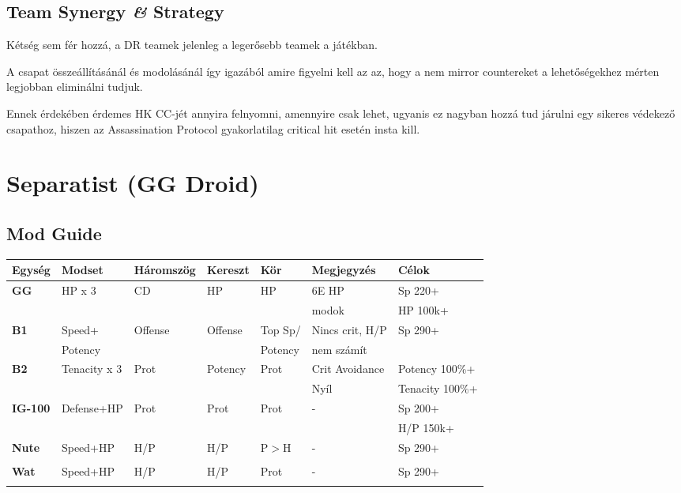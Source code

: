 \documentclass[11pt]{report}
\begin{document}
\section{Team Synergy \textit{\&} Strategy}
Kétség sem fér hozzá, a DR teamek jelenleg a legerősebb teamek a játékban. \par
A csapat összeállításánál és modolásánál így igazából amire figyelni kell az az, hogy a nem mirror countereket a lehetőségekhez mérten legjobban eliminálni tudjuk.\par
Ennek érdekében érdemes HK CC-jét annyira felnyomni, amennyire csak lehet, ugyanis ez nagyban hozzá tud járulni egy sikeres védekező csapathoz, hiszen az Assassination Protocol gyakorlatilag critical hit esetén insta kill. 


\chapter{Separatist (GG Droid)}
\section{Mod Guide}
\begin{center}
    \begin{tabular}{|l | l | l | l | l | l | l |}
        \hline
        Egység & Modset & Háromszög & Kereszt & Kör & Megjegyzés & Célok\\ \hline
        \textbf{GG} & HP x 3 & CD & HP & HP & 6E HP & Sp 220+\\
        &  &  &  &  & modok & HP 100k+\\ \hline
        \textbf{B1} & Speed+ & Offense & Offense & Top Sp/ & Nincs crit, H/P & Sp 290+\\
        & Potency &  &  & Potency & nem számít & \\ \hline
        \textbf{B2} & Tenacity x 3 & Prot & Potency & Prot & Crit Avoidance & Potency 100\%+\\
        &  &  &  &  & Nyíl & Tenacity 100\%+\\ \hline
        \textbf{IG-100} & Defense+HP & Prot & Prot & Prot & - & Sp 200+\\
        &  &  &  &  &  & H/P 150k+\\ \hline
        \textbf{Nute} & Speed+HP & H/P & H/P & P$>$H & - & Sp 290+\\
        &  &  &  &  &  & \\ \hline
        \textbf{Wat} & Speed+HP & H/P & H/P & Prot & - & Sp 290+\\
        &  &  &  &  &  & \\ \hline        
    \end{tabular}
\end{center}
\end{document}
